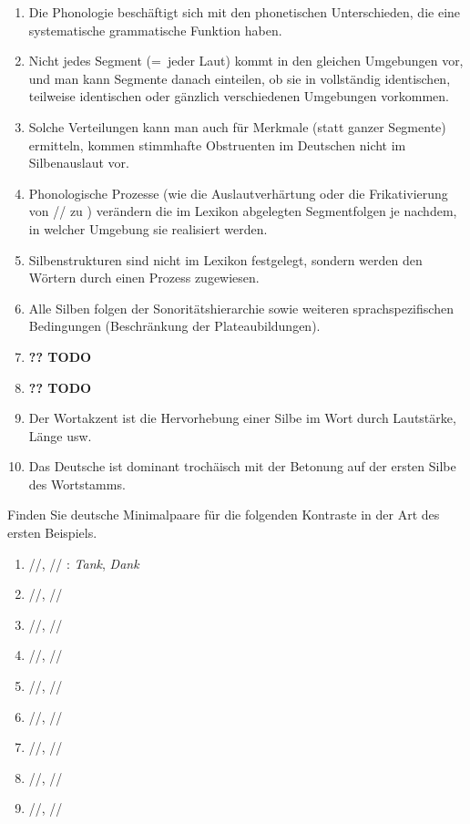 \begin{enumerate}
  \item Die Phonologie beschäftigt sich mit den phonetischen Unterschieden, die eine systematische grammatische Funktion haben.
  \item Nicht jedes Segment (=~jeder Laut) kommt in den gleichen Umgebungen vor, und man kann Segmente danach einteilen, ob sie in vollständig identischen, teilweise identischen oder gänzlich verschiedenen Umgebungen vorkommen.
  \item Solche Verteilungen kann man auch für Merkmale (statt ganzer Segmente) ermitteln, \zB kommen stimmhafte Obstruenten im Deutschen nicht im Silbenauslaut vor.
  \item Phonologische Prozesse (wie die Auslautverhärtung oder die Frikativierung von // zu \textipa{[i\c{c}]}) verändern die im Lexikon abgelegten Segmentfolgen je nachdem, in welcher Umgebung sie realisiert werden.
  \item Silbenstrukturen sind nicht im Lexikon festgelegt, sondern werden den Wörtern durch einen Prozess zugewiesen.
  \item Alle Silben folgen der Sonoritätshierarchie sowie weiteren sprachspezifischen Bedingungen (\zB Beschränkung der Plateaubildungen).
  \item \textbf{?? TODO}
  \item \textbf{?? TODO}
  \item Der Wortakzent ist die Hervorhebung einer Silbe im Wort durch Lautstärke, Länge usw.
  \item Das Deutsche ist dominant trochäisch mit der Betonung auf der ersten Silbe des Wortstamms.
\end{enumerate}

\Uebungen

\Uebung \label{u41} Finden Sie deutsche Minimalpaare für die folgenden Kontraste in der Art des ersten Beispiels.

\begin{enumerate}\Lf
  \item{//, // : \textit{Tank}, \textit{Dank}}
  \item{//, //}
  \item{//, //}
  \item{//, //}
  \item{//, //}
  \item{//, //}
  \item{//, //}
  \item{//, //}
  \item{//, //}
\end{enumerate}

